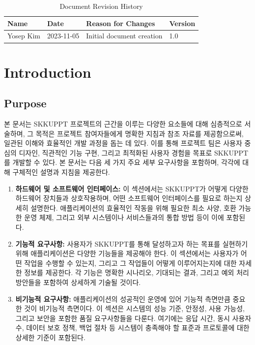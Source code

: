 \documentclass[a4paper, 12pt]{article}
\begin{document}
\setlength{\parindent}{1em} %



\tableofcontents

\newpage


\begin{table}[H]
\centering
\begin{tabularx}{\textwidth}{|l|l|X|l|}
\hline
\textbf{Name} & \textbf{Date} & \textbf{Reason for Changes} & \textbf{Version} \\
\hline
Yosep Kim & 2023-11-05 & Initial document creation & 1.0 \\
\hline
\end{tabularx}
\caption{Document Revision History}
\label{table:revision_history}
\end{table}


\newpage


\section{Introduction}
\subsection{Purpose}

본 문서는 SKKUPPT 프로젝트의 근간을 이루는 다양한 요소들에 대해 심층적으로 서술하며, 그 목적은 프로젝트 참여자들에게 명확한 지침과 참조 자료를 제공함으로써, 일관된 이해와 효율적인 개발 과정을 돕는 데 있다. 이를 통해 프로젝트 팀은 사용자 중심의 디자인, 직관적인 기능 구현, 그리고 최적화된 사용자 경험을 목표로 SKKUPPT를 개발할 수 있다. 본 문서는 다음 세 가지 주요 세부 요구사항을 포함하며, 각각에 대해 구체적인 설명과 지침을 제공한다.

\begin{enumerate}
\item \textbf{하드웨어 및 소프트웨어 인터페이스:} 이 섹션에서는 SKKUPPT가 어떻게 다양한 하드웨어 장치들과 상호작용하며, 어떤 소프트웨어 인터페이스를 필요로 하는지 상세히 설명한다. 애플리케이션의 효율적인 작동을 위해 필요한 최소 사양, 호환 가능한 운영 체제, 그리고 외부 시스템이나 서비스들과의 통합 방법 등이 이에 포함된다.

\item \textbf{기능적 요구사항:} 사용자가 SKKUPPT를 통해 달성하고자 하는 목표를 실현하기 위해 애플리케이션은 다양한 기능들을 제공해야 한다. 이 섹션에서는 사용자가 어떤 작업을 수행할 수 있는지, 그리고 그 작업들이 어떻게 이루어지는지에 대한 자세한 정보를 제공한다. 각 기능은 명확한 시나리오, 기대되는 결과, 그리고 예외 처리 방안들을 포함하여 상세하게 기술될 것이다.

\item \textbf{비기능적 요구사항:} 애플리케이션의 성공적인 운영에 있어 기능적 측면만큼 중요한 것이 비기능적 측면이다. 이 섹션은 시스템의 성능 기준, 안정성, 사용 가능성, 그리고 보안을 포함한 품질 요구사항들을 다룬다. 여기에는 응답 시간, 동시 사용자 수, 데이터 보호 정책, 백업 절차 등 시스템이 충족해야 할 표준과 프로토콜에 대한 상세한 기준이 포함된다.
\end{enumerate}
\end{document}
